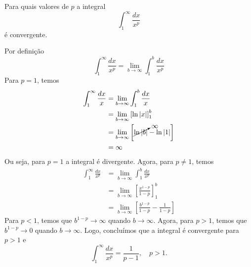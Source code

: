 \begin{exeresol}
  Para quais valores de $p$ a integral
  \begin{equation}
    \int_1^\infty\frac{dx}{x^p}
  \end{equation}
  é convergente.
\end{exeresol}
\begin{resol}
  Por definição
  \begin{equation}
    \int_1^\infty\frac{dx}{x^p} = \lim_{b\to\infty}\int_1^b\frac{dx}{x^p}
  \end{equation}
  Para $p=1$, temos
  \begin{align}
    \int_1^\infty\frac{dx}{x} &= \lim_{b\to\infty}\int_1^b\frac{dx}{x}\\
                              &= \lim_{b\to\infty}\left[\ln|x|\right]_1^b\\
                              &= \lim_{b\to\infty}\left[\cancelto{\infty}{\ln|b|} - \ln|1|\right]\\
                              &= \infty
  \end{align}
  Ou seja, para $p=1$ a integral é divergente. Agora, para $p\neq 1$, temos
  \begin{align}
    \int_1^\infty\frac{dx}{x^p} &= \lim_{b\to\infty}\int_1^b\frac{dx}{x^p}\\
                              &= \lim_{b\to\infty}\left[\frac{x^{1-p}}{1-p}\right]_1^b\\
                              &= \lim_{b\to\infty}\left[\frac{b^{1-p}}{1-p} - \frac{1}{1-p}\right]
  \end{align}
  Para $p<1$, temos que $b^{1-p}\to\infty$ quando $b\to\infty$. Agora, para $p>1$, temos que $b^{1-p}\to 0$ quando $b\to\infty$. Logo, concluímos que a integral é convergente para $p>1$ e
  \begin{equation}
    \int_1^\infty\frac{dx}{x^p} = \frac{1}{p-1},\quad p>1.
  \end{equation}
\end{resol}

